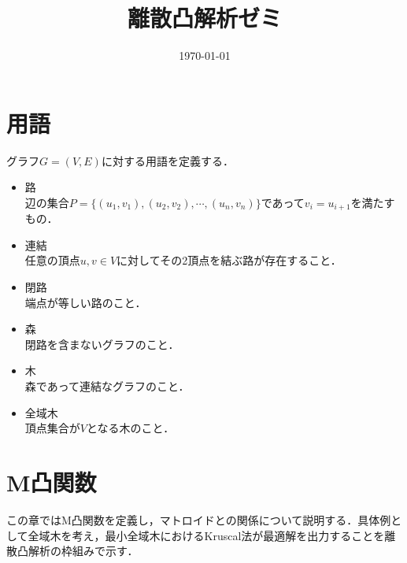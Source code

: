 \documentclass[uplatex]{jsarticle}
\title{離散凸解析ゼミ}
\date{\today}
\theoremstyle{break}
\begin{document}
\maketitle
\section*{用語}
グラフ$G=(V,E)$に対する用語を定義する．
\begin{itemize}
  \item 路 \\
    辺の集合$P = \{(u_1,v_1),(u_2,v_2),\cdots,(u_n,v_n)\}$であって$v_i = u_{i+1}$を満たすもの．
  \item 連結 \\
    任意の頂点$u,v\in V$に対してその2頂点を結ぶ路が存在すること．
  \item 閉路 \\
    端点が等しい路のこと．
  \item 森 \\
    閉路を含まないグラフのこと．
  \item 木 \\
    森であって連結なグラフのこと．
  \item 全域木 \\
    頂点集合が$V$となる木のこと．
\end{itemize}
\section{M凸関数}
この章ではM凸関数を定義し，マトロイドとの関係について説明する．具体例として全域木を考え，最小全域木におけるKruscal法が最適解を出力することを離散凸解析の枠組みで示す．
\end{document}
